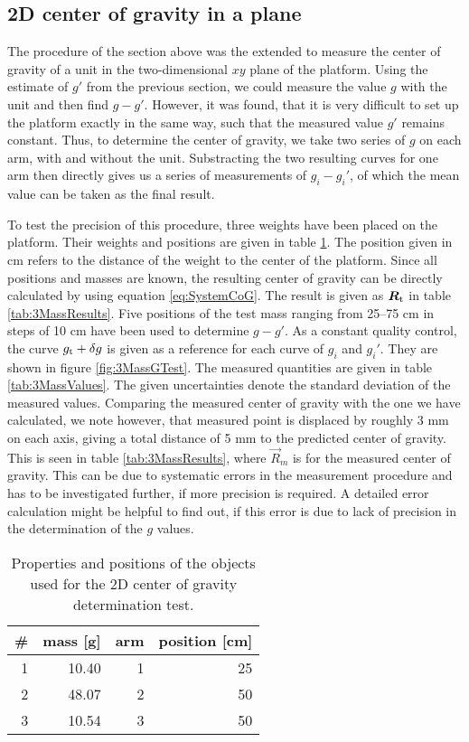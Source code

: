 \documentclass[journal]{IEEEtran}
\begin{document}
\subsection{2D center of gravity in a plane}
\label{sec:2DCoG}

The procedure of the section above was the extended to measure the center of gravity of a unit in the two-dimensional $xy$ plane of the platform.
Using the estimate of $g'$ from the previous section, we could measure the value $g$ with the unit and then find $g-g'$.
However, it was found, that it is very difficult to set up the platform exactly in the same way, such that the measured value $g'$ remains constant.
Thus, to determine the center of gravity, we take two series of $g$ on each arm, with and without the unit.
Substracting the two resulting curves for one arm then directly gives us a series of measurements of $g_i-g_i'$, of which the mean value can be taken as the final result.

To test the precision of this procedure, three weights have been placed on the platform.
Their weights and positions are given in table \ref{tab:3Mass}. The position given in cm refers to the distance of the weight to the center of the platform.
Since all positions and masses are known, the resulting center of gravity can be directly calculated by using equation \eqref{eq:SystemCoG}. The result is given as $\vec{R}_{\textup{t}}$ in table \ref{tab:3MassResults}.
Five positions of the test mass ranging from 25--75 cm in steps of 10 cm have been used to determine $g-g'$.
As a constant quality control, the curve $g_{\textup{t}} + \delta g$ is given as a reference for each curve of $g_i$ and $g_i'$. They are shown in figure \ref{fig:3MassGTest}.
The measured quantities are given in table \ref{tab:3MassValues}. The given uncertainties denote the standard deviation of the measured values.
Comparing the measured center of gravity with the one we have calculated, we note however, that measured point is displaced by roughly 3 mm on each axis, giving a total distance of 5 mm  to the predicted center of gravity. This is seen in table \ref{tab:3MassResults}, where $\vec{R}_m$ is for the measured center of gravity.
This can be due to systematic errors in the measurement procedure and has to be investigated further, if more precision is required. A detailed error calculation might be helpful to find out, if this error is due to lack of precision in the determination of the $g$ values.

\begin{table}
	\centering
	\begin{tabular}{r | r r r}
		\# & mass [g] & arm & position [cm] \\
		\hline
		1	&	10.40	&	1	&	25	\\
		2	&	48.07	&	2	&	50	\\
		3	&	10.54	&	3	&	50	\\
	\end{tabular}
	\caption{Properties and positions of the objects used for the 2D center of gravity determination test.}
	\label{tab:3Mass}
\end{table}
\end{document}
